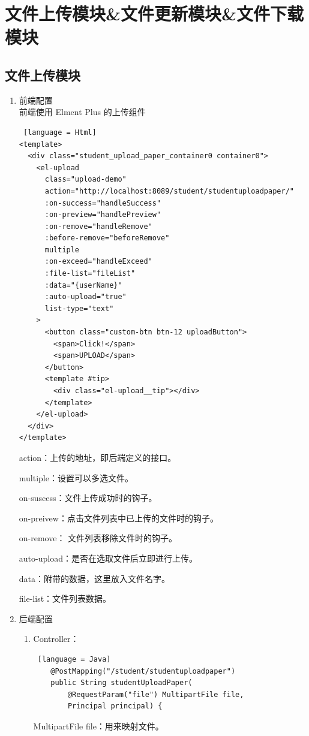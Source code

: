 \section{文件上传模块\&文件更新模块\&文件下载模块}

\subsection{文件上传模块}

\begin{enumerate}
  \item 前端配置\\
        前端使用 Elment Plus 的上传组件
        \begin{lstlisting} [language = Html]
<template>
  <div class="student_upload_paper_container0 container0">
    <el-upload
      class="upload-demo"
      action="http://localhost:8089/student/studentuploadpaper/"
      :on-success="handleSuccess"
      :on-preview="handlePreview"
      :on-remove="handleRemove"
      :before-remove="beforeRemove"
      multiple
      :on-exceed="handleExceed"
      :file-list="fileList"
      :data="{userName}"
      :auto-upload="true"
      list-type="text"
    >
      <button class="custom-btn btn-12 uploadButton">
        <span>Click!</span>
        <span>UPLOAD</span>
      </button>
      <template #tip>
        <div class="el-upload__tip"></div>
      </template>
    </el-upload>
  </div>
</template>
    \end{lstlisting}
        action：上传的地址，即后端定义的接口。

        multiple：设置可以多选文件。

        on-suscess：文件上传成功时的钩子。

        on-preivew：点击文件列表中已上传的文件时的钩子。

        on-remove：	文件列表移除文件时的钩子。

        auto-upload：是否在选取文件后立即进行上传。

        data：附带的数据，这里放入文件名字。

        file-list：文件列表数据。

  \item 后端配置
        \begin{enumerate}
          \item Controller：
                \begin{lstlisting} [language = Java]
    @PostMapping("/student/studentuploadpaper")
    public String studentUploadPaper(
        @RequestParam("file") MultipartFile file, 
        Principal principal) {
        \end{lstlisting}
                MultipartFile file：用来映射文件。


\end{enumerate}
\end{enumerate}
